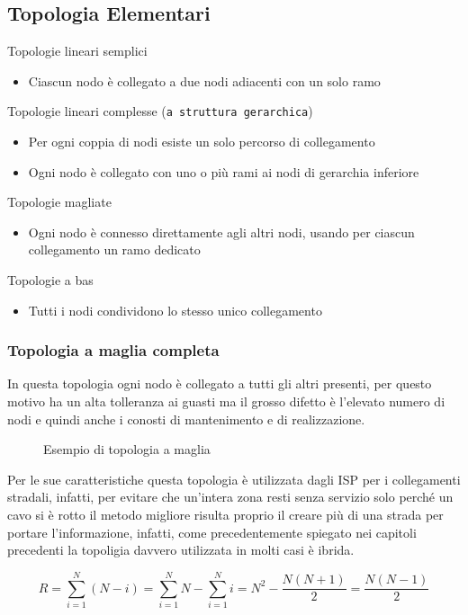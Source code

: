 \subsection{Topologia Elementari}
\label{sec:topologieelementari}
Topologie lineari semplici
\begin{itemize}
\item Ciascun nodo è collegato a due nodi adiacenti con un solo ramo
\end{itemize}
Topologie lineari complesse (\texttt{a struttura gerarchica})
\begin{itemize}
\item Per ogni coppia di nodi esiste un solo percorso di collegamento
\item Ogni nodo è collegato con uno o più rami ai nodi di gerarchia inferiore
\end{itemize}
Topologie magliate
\begin{itemize}
\item Ogni nodo è connesso direttamente agli altri nodi, usando per ciascun
  collegamento un ramo dedicato
\end{itemize}
Topologie a bas
\begin{itemize}
\item Tutti i nodi condividono lo stesso unico collegamento
\end{itemize}

\subsubsection{Topologia a maglia completa}
\label{sec:topologiaamagliacompleta}
In questa topologia ogni nodo è collegato a tutti gli altri presenti, per questo motivo
ha un alta tolleranza ai guasti ma il grosso difetto è l'elevato numero di nodi e quindi
anche i conosti di mantenimento e di realizzazione.
\begin{figure}[ht]
  \centering
  
  \caption{Esempio di topologia a maglia}
  \label{fig:topologiaamagliacompleta}
\end{figure}
\begin{oss}
  Per le sue caratteristiche questa topologia è utilizzata dagli ISP per i collegamenti
  stradali, infatti, per evitare che un'intera zona resti senza servizio solo perché
  un cavo si è rotto il metodo migliore risulta proprio il creare più di una strada
  per portare l'informazione, infatti, come precedentemente spiegato nei capitoli
  precedenti la topoligia davvero utilizzata in molti casi è ibrida.
\end{oss}
\begin{equation}
  \label{eq:magliacompleta}
  R=\sum\limits_{i=1}^N (N-i)=\sum\limits_{i=1}^N N - \sum\limits_{i=1}^N i = N^2-
  \frac{N(N+1)}{2} = \frac{N(N-1)}{2}
\end{equation}
\clearpage
